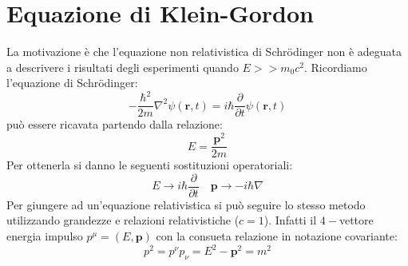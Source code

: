 \section{Equazione di Klein-Gordon}
La motivazione è che l'equazione non relativistica di Schr\"odinger non è adeguata a descrivere i risultati degli esperimenti quando $E>>m_0c^2$. Ricordiamo l'equazione di Schr\"odinger:
\begin{equation}
    -\frac{\hbar^2}{2m} \nabla^2 \psi(\mathbf{r}, t) = i\hbar \frac{\partial}{\partial t} \psi(\mathbf{r}, t)
    \label{eq:schrodinger}
\end{equation}
può essere ricavata partendo dalla relazione:
\begin{equation}
    E=\frac{\mathbf{p}^2}{2m}
\end{equation}
Per ottenerla si danno le seguenti sostituzioni operatoriali:
\begin{equation}
    E\to i\hbar\frac{\partial}{\partial t}\quad \mathbf{p}\to-i\hbar\nabla
\end{equation}
Per giungere ad un'equazione relativistica si può seguire lo stesso metodo utilizzando grandezze e relazioni relativistiche ($c=1$). Infatti il $4-$vettore energia impulso $p^\mu=(E,\mathbf{p})$ con la consueta relazione in notazione covariante:
\begin{equation}
    p^2=p^\nu p_\nu=E^2-\mathbf{p}^2=m^2
\end{equation}
